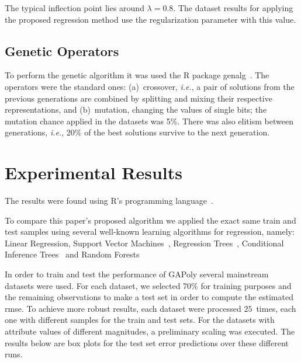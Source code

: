 \documentclass{elsarticle}
\begin{document}
The typical inflection point lies around $\lambda = 0.8$. The dataset results for applying the proposed regression method use the regularization parameter with this value.

\subsection{Genetic Operators}

To perform the genetic algorithm it was used the R package genalg~\cite{willighage2012genalg}. The operators were the standard ones: (a)~crossover, \emph{i.e.}, a pair of solutions from the previous generations are combined by splitting and mixing their respective representations, and (b)~mutation, changing the values of single bits; the mutation chance applied in the datasets was 5\%. There was also elitism between generations, \emph{i.e.}, 20\% of the best solutions survive to the next generation.

\section{Experimental Results}

The results were found using R's programming language~\cite{R}.

To compare this paper's proposed algorithm we applied the exact same train and test samples using several well-known learning algorithms for regression, namely: Linear Regression, Support Vector Machines~\cite{Meyer12}, Regression Trees~\cite{Therneau13}, Conditional Inference Trees~\cite{Hothorn06, Strobl07, Strobl08} and Random Forests~\cite{Liaw02}

In order to train and test the performance of \ac{GAPoly} several mainstream datasets were used. For each dataset, we selected 70\% for training purposes and the remaining observations to make a test set in order to compute the estimated \ac{rmse}. To achieve more robust results, each dataset were processed $25$~times, each one with different samples for the train and test sets. For the datasets with attribute values of different magnitudes, a preliminary scaling was executed. The results below are box plots for the test set error predictions over these different runs.
\end{document}
